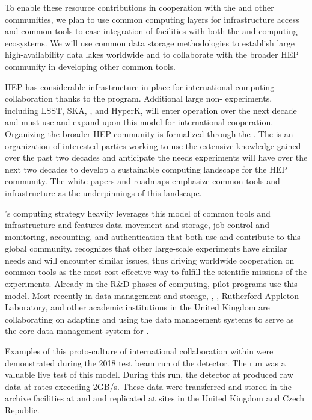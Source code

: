 To enable these resource contributions in cooperation with the  and other communities, we plan to use common computing layers for infrastructure access and common tools to ease integration of facilities with both the  and  computing ecosystems.  We will use common data storage methodologies to establish large high-availability data lakes worldwide  and to collaborate with the broader HEP community in developing other common tools.


HEP has considerable infrastructure in place for international computing collaboration thanks to the  program.  Additional large non- experiments, including LSST, SKA, , and HyperK,  will enter operation over the next decade and must use and expand upon this model for international cooperation.  Organizing the broader HEP community is formalized through the  \cite{Alves:2017she}.  The  is an organization of interested parties working to use the extensive knowledge gained over the past two decades and anticipate the needs experiments will have over the next two decades to develop a sustainable computing landscape for the HEP community.  The  white papers and roadmaps emphasize common tools and infrastructure as the underpinnings of this landscape.

's computing strategy heavily leverages this model of common tools and infrastructure and features data movement and storage, job control and monitoring, accounting, and authentication that both use and contribute to this global community.    recognizes that other large-scale experiments have similar needs and will encounter similar issues, thus driving worldwide cooperation on common tools as the most cost-effective way to fulfill the scientific missions of the experiments.  Already in the R\&D phases of  computing,  pilot programs use this model.  Most recently in data management and storage, , , Rutherford Appleton Laboratory, and other academic institutions in the United Kingdom are collaborating on adapting and using the  data management systems \cite{Barisits:2019fyl}  to serve as the core data management system for .

Examples of this proto-culture of international collaboration within  were demonstrated during the 2018 test beam run of the  detector.  The  run was a valuable live test of this model.  During this run, the  detector at  produced raw data at rates exceeding 2GB/s.  These data were transferred and stored in the archive facilities at  and  and replicated at sites in the United Kingdom and Czech Republic.

